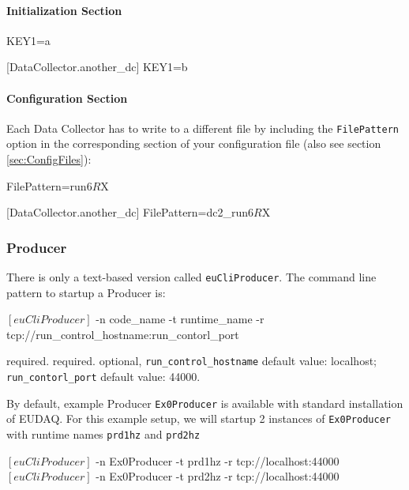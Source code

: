 \paragraph{Initialization Section}
\begin{listing}[conf]
[DataCollector.my_dc]
KEY1=a

[DataCollector.another_dc]
KEY1=b
\end{listing}

\paragraph{Configuration Section}
Each Data Collector has to write to a different file by including the
\texttt{FilePattern} option in the corresponding section of your
configuration file (also see section \ref{sec:ConfigFiles}):

\begin{listing}[conf]
[DataCollector.my_dc]
FilePattern=run$6R$X

[DataCollector.another_dc]
FilePattern=dc2_run$6R$X
\end{listing}


\subsubsection{Producer}
\label{sec:testproducer}
There is only a text-based version called \texttt{euCliProducer}.
The command line pattern to startup a Producer is:
\begin{listing}[mybash]
$[euCliProducer]$ -n {code_name} -t {runtime_name} -r tcp://{run_control_hostname}:{run_contorl_port}
\end{listing}

\begin{description}
required.
required.
optional, \texttt{run\_control\_hostname} default value: localhost;  \texttt{run\_contorl\_port}  default value: 44000.
\end{description}

By default, example Producer \texttt{Ex0Producer} is available with standard installation of EUDAQ.
For this example setup, we will startup 2 instances of \texttt{Ex0Producer} with runtime names \texttt{prd1hz} and \texttt{prd2hz}\\
\begin{listing}[mybash]
$[euCliProducer]$ -n Ex0Producer -t prd1hz -r tcp://localhost:44000
$[euCliProducer]$ -n Ex0Producer -t prd2hz -r tcp://localhost:44000
\end{listing}



